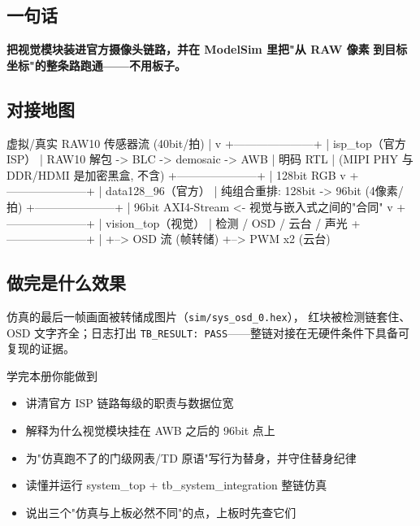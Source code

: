 \documentclass[11pt]{ctexart}
\newcommand{\code}[1]{\texttt{#1}}
\begin{document}
\subsection{一句话}

\textbf{把视觉模块装进官方摄像头链路，并在 ModelSim 里把"从 RAW 像素}
\textbf{到目标坐标"的整条路跑通——不用板子。}

\subsection{对接地图}

\begin{Verilog}
虚拟/真实 RAW10 传感器流 (40bit/拍)
      |
      v
+---------------------+
| isp_top（官方 ISP）  |  RAW10 解包 -> BLC -> demosaic -> AWB
| 明码 RTL             |  (MIPI PHY 与 DDR/HDMI 是加密黑盒, 不含)
+---------------------+
      |  128bit RGB
      v
+---------------------+
| data128_96（官方）   |  纯组合重排: 128bit -> 96bit (4像素/拍)
+---------------------+
      |  96bit AXI4-Stream  <- 视觉与嵌入式之间的"合同"
      v
+---------------------+
| vision_top（视觉）   |  检测 / OSD / 云台 / 声光
+---------------------+
      |
      +--> OSD 流 (帧转储)   +--> PWM x2 (云台)
\end{Verilog}

\subsection{做完是什么效果}

仿真的最后一帧画面被转储成图片（\code{sim/sys\_osd\_0.hex}），
红块被检测链套住、OSD 文字齐全；日志打出
\code{TB\_RESULT: PASS}——整链对接在无硬件条件下具备可复现的证据。

\begin{okbox}{学完本册你能做到}
\begin{itemize}
  \item 讲清官方 ISP 链路每级的职责与数据位宽
  \item 解释为什么视觉模块挂在 AWB 之后的 96bit 点上
  \item 为"仿真跑不了的门级网表/TD 原语"写行为替身，并守住替身纪律
  \item 读懂并运行 system\_top + tb\_system\_integration 整链仿真
  \item 说出三个"仿真与上板必然不同"的点，上板时先查它们
\end{itemize}
\end{okbox}

\end{document}

